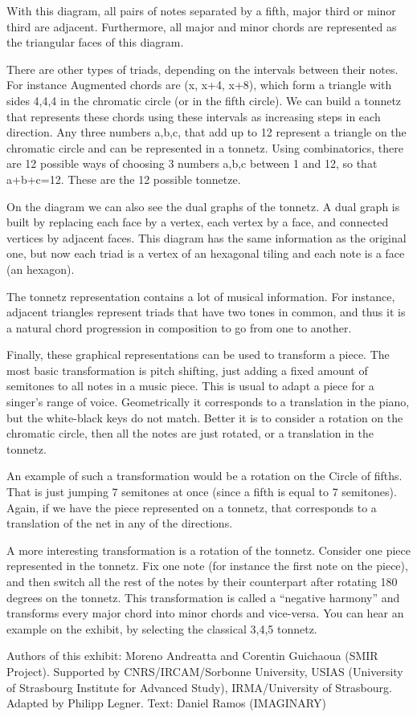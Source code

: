 With this diagram, all pairs of notes separated by a fifth, major third or minor third are adjacent. Furthermore, all major and minor chords are represented as the triangular faces of this diagram. 

There are other types of triads, depending on the intervals between their notes. For instance Augmented chords are (x, x+4, x+8), which form a triangle with sides 4,4,4 in the chromatic circle (or in the fifth circle). We can build a tonnetz that represents these chords using these intervals as increasing steps in each direction. Any three numbers a,b,c, that add up to 12 represent a triangle on the chromatic circle and can be represented in a tonnetz. Using combinatorics, there are 12 possible ways of choosing 3 numbers a,b,c between 1 and 12, so that a+b+c=12. These are the 12 possible tonnetze.

On the diagram we can also see the dual graphs of the tonnetz. A dual graph is built by replacing each face by a vertex, each vertex by a face, and connected vertices by adjacent faces. This diagram has the same information as the original one, but now each triad is a vertex of an hexagonal tiling and each note is a face (an hexagon).

The tonnetz representation contains a lot of musical information. For instance, adjacent triangles represent triads that have two tones in common, and thus it is a natural chord progression in composition to go from one to another.

Finally, these graphical representations can be used to transform a piece. The most basic transformation is pitch shifting, just adding a fixed amount of semitones to all notes in a music piece. This is usual to adapt a piece for a singer's range of voice. Geometrically it corresponds to a translation in the piano, but the white-black keys do not match. Better it is to consider a rotation on the chromatic circle, then all the notes are just rotated, or a translation in the tonnetz.

An example of such a transformation would be a rotation on the Circle of fifths. That is just jumping 7 semitones at once (since a fifth is equal to 7 semitones). Again, if we have the piece represented on a tonnetz, that corresponds to a translation of the net in any of the directions.

A more interesting transformation is a rotation of the tonnetz. Consider one piece represented in the tonnetz. Fix one note (for instance the first note on the piece), and then switch all the rest of the notes by their counterpart after rotating 180 degrees on the tonnetz. This transformation is called a ``negative harmony'' and transforms every major chord into minor chords and vice-versa. You can hear an example on the exhibit, by selecting the classical 3,4,5 tonnetz.

\vfill

Authors of this exhibit: Moreno Andreatta and Corentin Guichaoua (SMIR Project). Supported by CNRS/IRCAM/Sorbonne University, USIAS (University of Strasbourg Institute for Advanced Study), IRMA/University of Strasbourg. Adapted by Philipp Legner. Text: Daniel Ramos (IMAGINARY)


